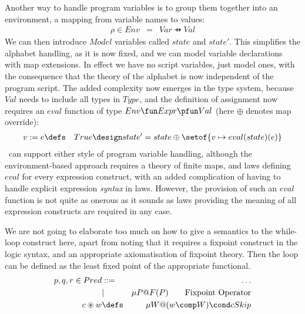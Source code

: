 Another way to handle program variables
is to group them together into an environment,
a mapping from variable names to values:
\begin{eqnarray*}
  \rho \in Env &=& Var \pfun Val
\end{eqnarray*}
We can then introduce $Model$ variables
called $state$ and $state'$.
This simplifies the alphabet handling, as it is now fixed,
and we can model variable declarations with map extensions.
In effect we have no script variables, just model ones,
with the consequence that the theory of the alphabet is now
independent of the program script.
The added complexity now emerges in the type system,
because $Val$ needs to include all types in $Type$,
and the definition of assignment now requires an $eval$
function of type $Env \fun Expr \pfun Val$
(here $\oplus$ denotes map override):
\begin{eqnarray*}
  v:=e &\defs& True \design state'=state \oplus \setof{v \mapsto eval(state)(e)}
\end{eqnarray*}
\ can support either style of program variable handling,
although the environment-based approach requires a theory
of finite maps, and laws defining $eval$ for every expression construct,
with an added complication of having to handle explicit expression \emph{syntax} in laws.
However, the provision of such an $eval$ function is not quite as onerous as it sounds
as laws providing the meaning of all expression constructs
are required in any case.



We are not going to elaborate too much on how to give
a semantics to the while-loop construct here,
apart from noting that it requires a fixpoint construct
in the logic syntax, and an appropriate axiomatisation of fixpoint theory.
Then the loop can be defined as the least fixed point of
the appropriate functional.
\begin{eqnarray*}
   p,q,r \in Pred &::=& \ldots
\\              &|& \mu P @ F(P) \qquad \mbox{Fixpoint Operator}
\\ c \circledast w &\defs& \mu W @ (w \comp W) \cond c Skip
\end{eqnarray*}
